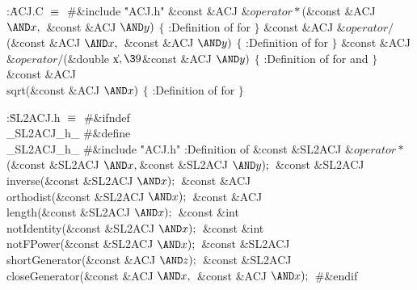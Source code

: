 \B{}:\.{ACJ.C }\X${}\equiv{}$\6
\8\#\&{include} \.{"ACJ.h"}\6
\&{const} \&{ACJ} ${}\&{operator}*{}$(\&{const} \&{ACJ} ${}{\AND}\|x,\39{}$%
\&{const} \&{ACJ} ${}{\AND}\|y){}$\1\1\2\2\6
${}\{{}$\1\6
:Definition of  for \X\6
\4${}\}{}$\2\7
\&{const} \&{ACJ} ${}\&{operator}{/}{}$(\&{const} \&{ACJ} ${}{\AND}\|x,\39{}$%
\&{const} \&{ACJ} ${}{\AND}\|y){}$\1\1\2\2\6
${}\{{}$\1\6
:Definition of  for \X\6
\4${}\}{}$\2\7
\&{const} \&{ACJ} ${}\&{operator}{/}{}$(\&{double} \|x${},\39{}$\&{const} %
\&{ACJ} ${}{\AND}\|y){}$\1\1\2\2\6
${}\{{}$\1\6
:Definition of  for  and %
\X\6
\4${}\}{}$\2\7
\&{const} \&{ACJ} \\{sqrt}(\&{const} \&{ACJ} ${}{\AND}\|x){}$\1\1\2\2\6
${}\{{}$\1\6
:Definition of  for \X\6
\4${}\}{}$\2\par
\fi

\B{}:\.{SL2ACJ.h }\X${}\equiv{}$\6
\8\#\&{ifndef} \\{\_SL2ACJ\_h\_}\6
\8\#\&{define} \\{\_SL2ACJ\_h\_}\6
\8\#\&{include} \.{"ACJ.h"}\6
:Definition of \X\7
\&{const} \&{SL2ACJ} ${}\&{operator}*{}$(\&{const} \&{SL2ACJ} ${}{\AND}\|x,%
\39{}$\&{const} \&{SL2ACJ} ${}{\AND}\|y);{}$\6
\&{const} \&{SL2ACJ} \\{inverse}(\&{const} \&{SL2ACJ} ${}{\AND}\|x);{}$\6
\&{const} \&{ACJ} \\{orthodist}(\&{const} \&{SL2ACJ} ${}{\AND}\|x);{}$\6
\&{const} \&{ACJ} \\{length}(\&{const} \&{SL2ACJ} ${}{\AND}\|x);{}$\6
\&{const} \&{int} \\{notIdentity}(\&{const} \&{SL2ACJ} ${}{\AND}\|x);{}$\6
\&{const} \&{int} \\{notFPower}(\&{const} \&{SL2ACJ} ${}{\AND}\|x);{}$\6
\&{const} \&{SL2ACJ} \\{shortGenerator}(\&{const} \&{ACJ} ${}{\AND}\|z);{}$\6
\&{const} \&{SL2ACJ} \\{closeGenerator}(\&{const} \&{ACJ} ${}{\AND}\|x,\39{}$%
\&{const} \&{ACJ} ${}{\AND}\|x);{}$\6
\8\#\&{endif}\par
\fi

